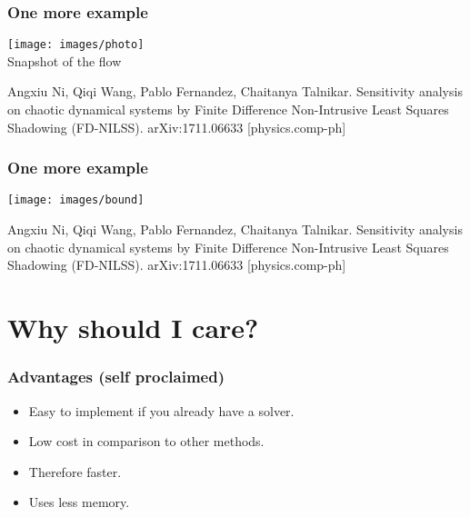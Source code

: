 \documentclass{beamer}
\begin{document}
  \begin{frame}
    \frametitle{One more example}
    \begin{center}


    \texttt{[image: images/photo]}\\

    Snapshot of the flow\\

  \end{center}

  \tiny{Angxiu Ni, Qiqi Wang, Pablo Fernandez, Chaitanya Talnikar. Sensitivity analysis on chaotic dynamical systems by Finite Difference Non-Intrusive Least Squares Shadowing (FD-NILSS).	arXiv:1711.06633 [physics.comp-ph]}
  \end{frame}

  \begin{frame}

  \frametitle{One more example}
  \begin{center}


  \texttt{[image: images/bound]}\\


\end{center}

\tiny{Angxiu Ni, Qiqi Wang, Pablo Fernandez, Chaitanya Talnikar. Sensitivity analysis on chaotic dynamical systems by Finite Difference Non-Intrusive Least Squares Shadowing (FD-NILSS).	arXiv:1711.06633 [physics.comp-ph]}
\end{frame}

\section{Why should I care?}

\begin{frame}
  \frametitle{Advantages (self proclaimed)}
  \begin{itemize}
    \item Easy to implement if you already have a solver.
    \item Low cost in comparison to other methods.\pause
    \item Therefore faster.
    \item Uses less memory.
  \end{itemize}
\end{frame}
\end{document}
